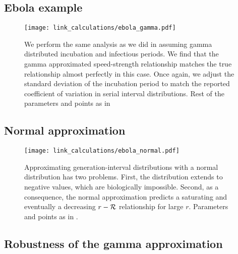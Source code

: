 
\setcounter{figure}{0}
\renewcommand{\thefigure}{S\arabic{figure}}

\subsection{Ebola example}

\begin{figure}[htbp] \centering
	\texttt{[image: link\_calculations/ebola\_gamma.pdf]}
\caption{
We perform the same analysis as we did in  assuming gamma distributed incubation and infectious periods. 
We find that the gamma approximated speed-strength relationship matches the true relationship almost perfectly in this case.
Once again, we adjust the standard deviation of the incubation period to match the reported coefficient of variation in serial interval distributions. Rest of the parameters and points as in 
}
	\label{fig:ebolaNormal}
\end{figure}

\subsection{Normal approximation}

\begin{figure}[htbp] \centering
	\texttt{[image: link\_calculations/ebola\_normal.pdf]}
\caption{
Approximating generation-interval distributions with a normal distribution has two problems. First, the distribution extends to negative values, which are biologically impossible. Second, as a consequence, the normal approximation predicts a saturating and eventually a decreasing $r-{\cal R}$ relationship for large $r$. Parameters and points as in .
}
	\label{fig:ebolaNormal}
\end{figure}

\subsection{Robustness of the gamma approximation}

